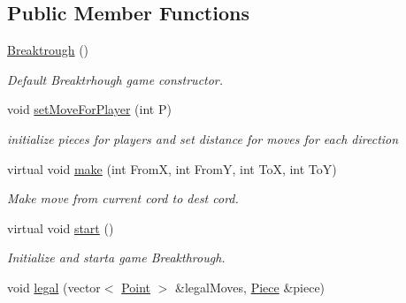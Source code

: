 \subsection*{Public Member Functions}
\begin{DoxyCompactItemize}
\item 
\hypertarget{class_breaktrough_a988083f0722bff1058a980748c65705f}{\hyperlink{class_breaktrough_a988083f0722bff1058a980748c65705f}{Breaktrough} ()}\label{class_breaktrough_a988083f0722bff1058a980748c65705f}

\begin{DoxyCompactList}\small\item\em Default Breaktrhough game constructor. \end{DoxyCompactList}\item 
\hypertarget{class_breaktrough_a1e1244669a6ab63043329afcdaaeec37}{void \hyperlink{class_breaktrough_a1e1244669a6ab63043329afcdaaeec37}{set\-Move\-For\-Player} (int P)}\label{class_breaktrough_a1e1244669a6ab63043329afcdaaeec37}

\begin{DoxyCompactList}\small\item\em initialize pieces for players and set distance for moves for each direction \end{DoxyCompactList}\item 
\hypertarget{class_breaktrough_a07006aa5d9919ddefa68554f3022afc6}{virtual void \hyperlink{class_breaktrough_a07006aa5d9919ddefa68554f3022afc6}{make} (int From\-X, int From\-Y, int To\-X, int To\-Y)}\label{class_breaktrough_a07006aa5d9919ddefa68554f3022afc6}

\begin{DoxyCompactList}\small\item\em Make move from current cord to dest cord. \end{DoxyCompactList}\item 
\hypertarget{class_breaktrough_a1e4b2c80e074f7052c4c491abe95c9f6}{virtual void \hyperlink{class_breaktrough_a1e4b2c80e074f7052c4c491abe95c9f6}{start} ()}\label{class_breaktrough_a1e4b2c80e074f7052c4c491abe95c9f6}

\begin{DoxyCompactList}\small\item\em Initialize and starta game Breakthrough. \end{DoxyCompactList}\item 
\hypertarget{class_breaktrough_a6bf5d444ace61244df9a0255fde5d533}{void \hyperlink{class_breaktrough_a6bf5d444ace61244df9a0255fde5d533}{legal} (vector$<$ \hyperlink{struct_point}{Point} $>$ \&legal\-Moves, \hyperlink{class_piece}{Piece} \&piece)}\label{class_breaktrough_a6bf5d444ace61244df9a0255fde5d533}


\end{DoxyCompactItemize}

